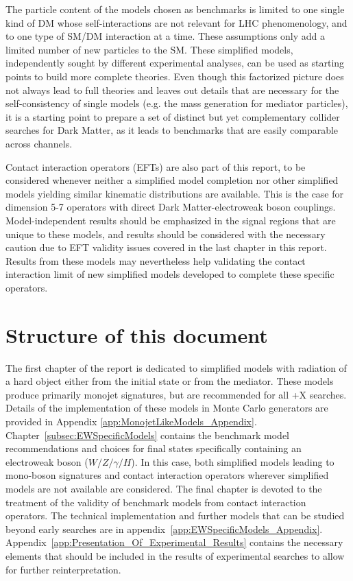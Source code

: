 The particle content of the models chosen as benchmarks is limited to
one single kind of DM whose self-interactions are not relevant for LHC
phenomenology, and to one type of SM/DM interaction at a time. These
assumptions only add a limited number of new particles to the
SM. These simplified models, independently sought by different
experimental analyses, can be used as starting points to build more
complete theories. Even though this factorized picture does not always
lead to full theories and leaves out details that are necessary for
the self-consistency of single models (e.g. the mass generation for
mediator particles), it is a starting point to prepare a set of
distinct but yet complementary collider searches for Dark Matter, as
it leads to benchmarks that are easily comparable across channels.

Contact interaction operators (EFTs) are also part of this report, 
to be considered whenever neither a simplified model completion 
nor other simplified models 
yielding similar kinematic distributions are available. 
This is the case for dimension 5-7 operators with direct 
Dark Matter-electroweak boson couplings. 
Model-independent results should be emphasized 
in the signal regions that are unique to these models, 
and results should be considered with the necessary caution due to EFT 
validity issues covered in the last chapter in this report. 
Results from these models may nevertheless help validating the 
contact interaction limit of new simplified models developed to complete 
these specific operators. 

\section{Structure of this document}

The first chapter of the report is dedicated to simplified
models with radiation of a hard object either from the initial state
or from the mediator. These models produce primarily monojet signatures, 
but are recommended for all \MET{}+X searches.
Details of the implementation of these models in
Monte Carlo generators are provided in
Appendix \ref{app:MonojetLikeModels_Appendix}.
Chapter~\ref{subsec:EWSpecificModels} contains the benchmark model
recommendations and choices for final states specifically containing an electroweak 
boson ($W/Z/\gamma/H$). In this case, both
simplified models leading to mono-boson signatures
and contact interaction operators wherever simplified models are not available are considered. 
The final chapter is devoted to the treatment of the validity of benchmark
models from contact interaction operators.
The technical implementation and further models that can be studied
beyond early searches are in appendix~\ref{app:EWSpecificModels_Appendix}. 
Appendix~\ref{app:Presentation_Of_Experimental_Results} contains the necessary elements that
should be included in the results of experimental searches to allow for further reinterpretation. 


